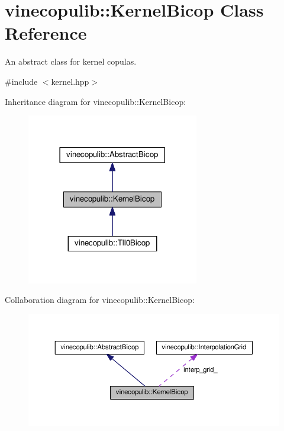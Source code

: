 \hypertarget{classvinecopulib_1_1_kernel_bicop}{}\section{vinecopulib\+:\+:Kernel\+Bicop Class Reference}
\label{classvinecopulib_1_1_kernel_bicop}


An abstract class for kernel copulas.  




{\ttfamily \#include $<$kernel.\+hpp$>$}



Inheritance diagram for vinecopulib\+:\+:Kernel\+Bicop\+:
\nopagebreak
\begin{figure}[H]
\begin{center}
\leavevmode
\includegraphics[width=213pt]{classvinecopulib_1_1_kernel_bicop__inherit__graph}
\end{center}
\end{figure}


Collaboration diagram for vinecopulib\+:\+:Kernel\+Bicop\+:
\nopagebreak
\begin{figure}[H]
\begin{center}
\leavevmode
\includegraphics[width=350pt]{classvinecopulib_1_1_kernel_bicop__coll__graph}
\end{center}
\end{figure}
